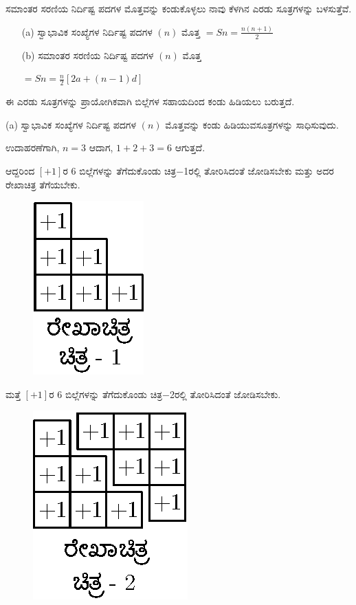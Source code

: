 ಸಮಾಂತರ ಸರಣಿಯ ನಿರ್ದಿಷ್ಟ ಪದಗಳ ಮೊತ್ತವನ್ನು ಕಂಡುಕೊಳ್ಳಲು ನಾವು ಕೆಳಗಿನ ಎರಡು ಸೂತ್ರಗಳನ್ನು ಬಳಸುತ್ತೆವೆ.
\begin{itemize}
\item [(a)] ಸ್ವಾಭಾವಿಕ ಸಂಖ್ಯೆಗಳ ನಿರ್ದಿಷ್ಟ ಪದಗಳ $(n)$ ಮೊತ್ತ $= Sn = \frac{n(n+1)}{2}$
\item [(b)] ಸಮಾಂತರ ಸರಣಿಯ ನಿರ್ದಿಷ್ಟ ಪದಗಳ $(n)$ ಮೊತ್ತ 

  {\small$= Sn = \frac{n}{2} [2a +(n-1)d]$}
\end{itemize}

\eject

ಈ ಎರಡು ಸೂತ್ರಗಳನ್ನು ಪ್ರಾಯೋಗಿಕವಾಗಿ ಬಿಲ್ಲೆಗಳ ಸಹಾಯದಿಂದ ಕಂಡು ಹಿಡಿ\break ಯಲು ಬರುತ್ತದೆ. 

(a) ಸ್ವಾಭಾವಿಕ ಸಂಖ್ಯೆಗಳ ನಿರ್ದಿಷ್ಟ ಪದಗಳ $(n)$ ಮೊತ್ತವನ್ನು ಕಂಡು ಹಿಡಿಯುವ\break ಸೂತ್ರಗಳನ್ನು ಸಾಧಿಸುವುದು. 

ಉದಾಹರಣೆಗಾಗಿ, $n = 3$ ಆದಾಗ, $1 + 2 + 3 = 6$ ಆಗುತ್ತದೆ. 

ಆದ್ದರಿಂದ $[+1]$ರ 6 ಬಿಲ್ಲೆಗಳನ್ನು ತೆಗೆದುಕೊಂಡು ಚಿತ್ರ$-$1ರಲ್ಲಿ ತೋರಿಸಿದಂತೆ ಜೋಡಿಸ\-ಬೇಕು ಮತ್ತು ಅದರ ರೇಖಾಚಿತ್ರ ತೆಗೆಯಬೇಕು.
\begin{figure}[H]
\centering
\includegraphics{src/figure/chap3/fig3-57a.eps}
\end{figure}

ಮತ್ತೆ $[+1]$ರ 6 ಬಿಲ್ಲೆಗಳನ್ನು ತೆಗೆದುಕೊಂಡು ಚಿತ್ರ$-$2ರಲ್ಲಿ ತೋರಿಸಿದಂತೆ ಜೋಡಿಸ\-ಬೇಕು.
\begin{figure}[H]
\centering
\includegraphics{src/figure/chap3/fig3-57b.eps}
\end{figure}

